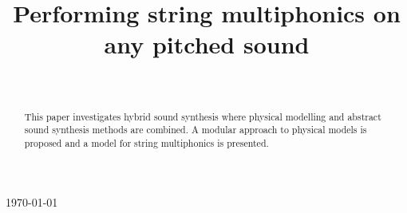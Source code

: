 \documentclass{sigchi}
\def\plaintitle{Performing string multiphonics on any pitched sound}
\begin{document}
\title{\plaintitle}

\author{%
	\\
}

\maketitle


\today
\begin{abstract}
	This paper investigates hybrid sound synthesis where physical modelling and abstract sound synthesis methods are combined.
	A modular approach to physical models is proposed and a model for string multiphonics is presented.
\end{abstract}



\end{document}

